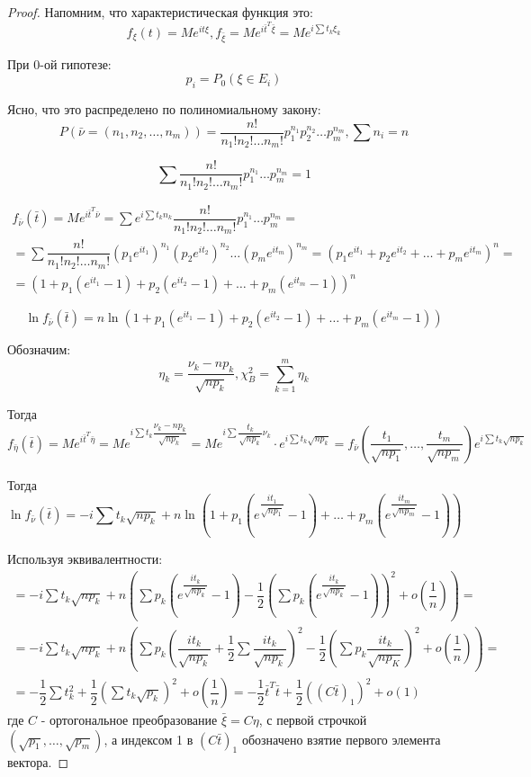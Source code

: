 \begin{proof}
  Напомним, что характеристическая функция это:
  \[
    f_\xi (t) = M e^{i t \xi}, f_{\bar \xi} = M e^{i \bar t^T \bar \xi} = M e^{i \sum t_k \xi_k}
  \]

  При 0-ой гипотезе:
  \[
    p_i = P_0 (\xi \in E_i)
  \]

  Ясно, что это распределено по полиномиальному закону:
  \[
    P(\bar \nu = (n_1, n_2, \dots, n_m)) = \dfrac{n!}{n_1! n_2! \dots n_m!} p_1^{n_1} p_2^{n_2} \dots p_m^{n_m}, \sum n_i = n
  \]

  \[
    \sum \dfrac{n!}{n_1! n_2! \dots n_m!} p_1^{n_1} \dots p_m^{n_m} = 1
  \]

  \begin{multline*}
    f_{\bar \nu} (\bar t) = M e^{i \bar t^T \bar \nu} =
    \sum e^{i \sum t_k n_k} \dfrac{n!}{n_1! n_2! \dots n_m!} p_1^{n_1} \dots p_m^{n_m} = \\
    = \sum \dfrac{n!}{n_1! n_2! \dots n_m!} (p_1 e^{i t_1})^{n_1} (p_2 e^{i t_2})^{n_2} \dots (p_m e^{i t_m})^{n_m} = 
    (p_1 e^{i t_1} + p_2 e^{i t_2} + \dots + p_m e^{i t_m})^n = \\
    = (1 + p_1 (e^{i t_1} - 1) + p_2 (e^{i t_2} - 1) + \dots + p_m (e^{i t_m} - 1))^n
  \end{multline*}

  \[
    \ln f_{\bar \nu} (\bar t) = n \ln (1 + p_1 (e^{i t_1} - 1) + p_2 (e^{i t_2} - 1) + \dots + p_m (e^{i t_m} - 1))
  \]

  Обозначим: 
  \[
    \eta_k = \dfrac{\nu_k - np_k}{\sqrt{np_k}}, \chi^2_B = \sum_{k=1}^m \eta_k
  \]

  Тогда
  \[
    f_{\bar \eta} (\bar t) = M e^{i \bar t^T \bar \eta} =
    M e^{i \sum t_k \dfrac{\nu_k - np_k}{\sqrt{np_k}}} = 
    M e^{i \sum \dfrac{t_k}{\sqrt{np_k}} \nu_k} \cdot e^{i \sum t_k \sqrt{np_k}} = 
    f_{\bar \nu} (\dfrac{t_1}{\sqrt{np_1}}, \dots, \dfrac{t_m}{\sqrt{np_m}}) e^{i \sum t_k \sqrt{np_k}}
  \]

  Тогда
  \[
    \ln f_{\bar \nu} (\bar t) = -i \sum t_k \sqrt{np_k} + n \ln (1+p_1 (e^{\dfrac{i t_1}{\sqrt{np_1}}} - 1)+ \dots + p_m (e^{\dfrac{i t_m}{\sqrt{np_m}}} - 1) )
  \]

  Используя эквивалентности:
  \begin{multline*}
    = -i \sum t_k \sqrt{np_k} + n \left( \sum p_k (e^{\dfrac{i t_k}{\sqrt{np_k}}} - 1) - \dfrac{1}{2} (\sum p_k(e^{\dfrac{i t_k}{\sqrt{np_k}}} - 1))^2 + o(\dfrac{1}{n}) \right) = \\
    = -i \sum t_k \sqrt{np_k} + n \left( \sum p_k (\dfrac{i t_k}{\sqrt{np_k}} + \dfrac{1}{2} \sum \dfrac{i t_k}{\sqrt{np_k}})^2 - \dfrac{1}{2} (\sum p_k \dfrac{i t_k}{\sqrt{np_K}})^2 + o(\dfrac{1}{n}) \right) = \\
    = - \dfrac{1}{2} \sum t_k^2 + \dfrac{1}{2} \left( \sum t_k \sqrt{p_k} \right)^2 + o\left(\dfrac{1}{n}\right)
    = - \dfrac{1}{2} \bar t^T \bar t + \dfrac{1}{2} ((C \bar t)_1)^2 + o(1)
  \end{multline*}
  где $C$ - ортогональное преобразование $\bar \xi = C \eta$, с первой строчкой $(\sqrt{p_1}, \dots, \sqrt{p_m})$,
    а индексом 1 в $(C \bar t)_1$ обозначено взятие первого элемента вектора.


\end{proof}
